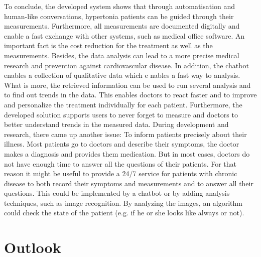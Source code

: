 To conclude, the developed system shows that through automatisation and human-like conversations, hypertonia patients can be guided through their measurements. Furthermore, all measurements are documented digitally and enable a fast exchange with other systems, such as medical office software.
An important fact is the cost reduction for the treatment as well as the measurements. Besides, the data analysis can lead to a more precise medical research and prevention against cardiovascular disease. In addition, the chatbot enables a collection of qualitative data which e nables a fast way to analysis.
What is more, the retrieved information can be used to run several analysis and to find out trends in the data. This enables doctors to react faster and to improve and personalize the treatment individually for each patient.
Furthermore, the developed solution supports users to never forget to measure and doctors to better understand trends in the measured data.
During development and research, there came up another issue: To inform patients precisely about their illness. Most patients go to doctors and describe their symptoms, the doctor makes a diagnosis and provides them medication. But in most cases, doctors do not have enough time to answer all the questions of their patients. For that reason it might be useful to provide a 24/7 service for patients with chronic disease to both record their symptoms and measurements and to answer all their questions. This could be implemented by a chatbot or by adding analysis techniques, such as image recognition. By analyzing the images, an algorithm could check the state of the patient (e.g. if he or she looks like always or not). 

\section{Outlook}

